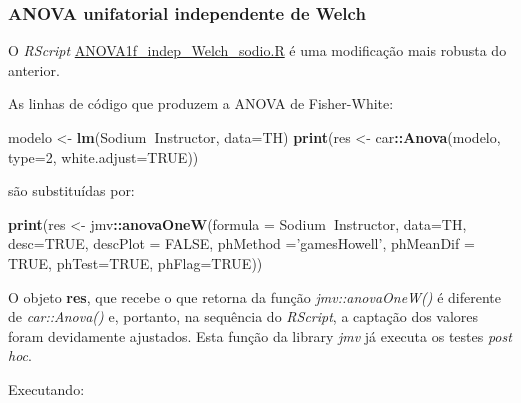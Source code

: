 \documentclass[]{article}
\newenvironment{Shaded}{\begin{snugshade}}{\end{snugshade}}
\newcommand{\KeywordTok}[1]{\textcolor[rgb]{0.13,0.29,0.53}{\textbf{#1}}}
\newcommand{\DataTypeTok}[1]{\textcolor[rgb]{0.13,0.29,0.53}{#1}}
\newcommand{\DecValTok}[1]{\textcolor[rgb]{0.00,0.00,0.81}{#1}}
\newcommand{\StringTok}[1]{\textcolor[rgb]{0.31,0.60,0.02}{#1}}
\newcommand{\OtherTok}[1]{\textcolor[rgb]{0.56,0.35,0.01}{#1}}
\newcommand{\OperatorTok}[1]{\textcolor[rgb]{0.81,0.36,0.00}{\textbf{#1}}}
\newcommand{\NormalTok}[1]{#1}
\begin{document}
\subsubsection{ANOVA unifatorial independente de
Welch}\label{anova-unifatorial-independente-de-welch}

O \emph{RScript} \url{ANOVA1f_indep_Welch_sodio.R} é uma modificação
mais robusta do anterior.

As linhas de código que produzem a ANOVA de Fisher-White:

\begin{Shaded}
\begin{Highlighting}[]
\NormalTok{modelo <-}\StringTok{ }\KeywordTok{lm}\NormalTok{(Sodium}\OperatorTok{~}\NormalTok{Instructor, }\DataTypeTok{data=}\NormalTok{TH)}
\KeywordTok{print}\NormalTok{(res <-}\StringTok{ }\NormalTok{car}\OperatorTok{::}\KeywordTok{Anova}\NormalTok{(modelo, }\DataTypeTok{type=}\DecValTok{2}\NormalTok{, }\DataTypeTok{white.adjust=}\OtherTok{TRUE}\NormalTok{))}
\end{Highlighting}
\end{Shaded}

são substituídas por:

\begin{Shaded}
\begin{Highlighting}[]
\KeywordTok{print}\NormalTok{(res <-}\StringTok{ }\NormalTok{jmv}\OperatorTok{::}\KeywordTok{anovaOneW}\NormalTok{(}\DataTypeTok{formula =}\NormalTok{ Sodium}\OperatorTok{~}\NormalTok{Instructor, }\DataTypeTok{data=}\NormalTok{TH,}
                       \DataTypeTok{desc=}\OtherTok{TRUE}\NormalTok{, }\DataTypeTok{descPlot =} \OtherTok{FALSE}\NormalTok{, }\DataTypeTok{phMethod =}\StringTok{'gamesHowell'}\NormalTok{,}
                       \DataTypeTok{phMeanDif =} \OtherTok{TRUE}\NormalTok{, }\DataTypeTok{phTest=}\OtherTok{TRUE}\NormalTok{, }\DataTypeTok{phFlag=}\OtherTok{TRUE}\NormalTok{))}
\end{Highlighting}
\end{Shaded}

O objeto \textbf{res}, que recebe o que retorna da função
\emph{jmv::anovaOneW()} é diferente de \emph{car::Anova()} e, portanto,
na sequência do \emph{RScript}, a captação dos valores foram devidamente
ajustados. Esta função da library \emph{jmv} já executa os testes
\emph{post hoc}.

Executando:
\end{document}
